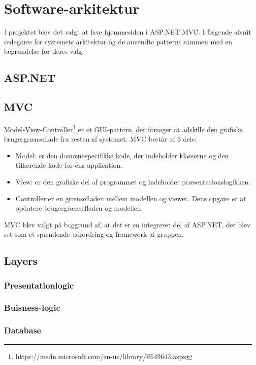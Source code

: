 \chapter{Software-arkitektur}

I projektet blev det valgt at lave hjemmesiden i ASP.NET MVC. I følgende afsnit redegøres for systemets arkitektur og de anvendte patterns sammen med en begrundelse for deres valg.

\section{ASP.NET}

\section{MVC}
Model-View-Controller\footnote{https://msdn.microsoft.com/en-us/library/ff649643.aspx} er et GUI-pattern, der forsøger at adskille den grafiske brugergrænseflade fra resten af systemet. MVC består af 3 dele:
\begin{itemize}
	\item Model: er den domænespecifikke kode, der indeholder klasserne og den tilhørende kode for ens application.
	\item View: er den grafiske del af programmet og indeholder præsentationslogikken.
	\item Controller:er en grænsefladen mellem modellen og viewet. Dens opgave er at opdatere brugergrænsefladen og modellen.
\end{itemize}

MVC blev valgt på baggrund af, at det er en integreret del af ASP.NET, der blev set som et spændende udfordring og framework af gruppen. 

\section{Layers}
\subsection{Presentationlogic}
\subsection{Buisness-logic}
\subsection{Database}


